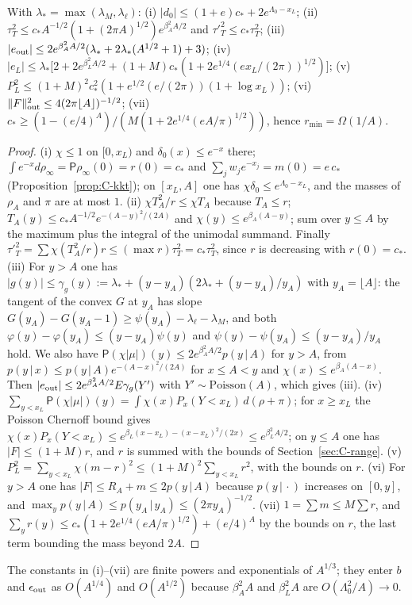 \begin{lemma}\label{lem:C-edge}
With $\lambda_*=\max(\lambda_M,\lambda_\ell)$:
(i) $|d_0|\le(1+e)c_*+2e^{\Lambda_0-x_L}$;
(ii) $\tau_T^2\le c_*A^{-1/2}(1+(2\pi A)^{1/2})e^{\beta_A^2A/2}$ and $\tau'^2_T\le c_*\tau_T^2$;
(iii) $|e_{\rm out}|\le2e^{\beta_A^2A/2}(\lambda_*+2\lambda_*(A^{1/2}+1)+3)$;
(iv) $|e_L|\le\lambda_*\bigl[2+2e^{\beta_L^2A/2}+(1+M)c_*(1+2e^{1/4}(ex_L/(2\pi))^{1/2})\bigr]$;
(v) $P_L^2\le(1+M)^2c_*^2(1+e^{1/2}(e/(2\pi))(1+\log x_L))$;
(vi) $\|F\|^2_{\rm out}\le4(2\pi\lfloor A\rfloor)^{-1/2}$;
(vii) $c_*\ge(1-(e/4)^A)/(M(1+2e^{1/4}(eA/\pi)^{1/2}))$, hence $r_{\min}=\Omega(1/A)$.
\end{lemma}
\begin{proof}
(i) $\chi\le1$ on $[0,x_L)$ and $\delta_0(x)\le e^{-x}$ there; $\int e^{-x}d\rho_\infty=\mathsf P\rho_\infty(0)=r(0)=c_*$ and
$\sum_jw_je^{-x_j}=m(0)=e\,c_*$ (Proposition~\ref{prop:C-kkt}); on $[x_L,A]$ one has $\chi\delta_0\le e^{\Lambda_0-x_L}$, and the masses of
$\rho_A$ and $\pi$ are at most $1$.
(ii) $\chi T_A^2/r\le\chi T_A$ because $T_A\le r$; $T_A(y)\le c_*A^{-1/2}e^{-(A-y)^2/(2A)}$ and $\chi(y)\le e^{\beta_A(A-y)}$; sum over
$y\le A$ by the maximum plus the integral of the unimodal summand. Finally $\tau'^2_T=\sum\chi(T_A^2/r)r\le(\max r)\tau_T^2=c_*\tau_T^2$,
since $r$ is decreasing with $r(0)=c_*$.
(iii) For $y>A$ one has $|g(y)|\le\gamma_g(y):=\lambda_*+(y-y_A)(2\lambda_*+(y-y_A)/y_A)$ with $y_A=\lfloor A\rfloor$: the tangent of the convex
$G$ at $y_A$ has slope $G(y_A)-G(y_A-1)\ge\psi(y_A)-\lambda_\ell-\lambda_M$, and both $\varphi(y)-\varphi(y_A)\le(y-y_A)\psi(y)$ and $\psi(y)-\psi(y_A)\le(y-y_A)/y_A$ hold. We also have $\mathsf P(\chi|\mu|)(y)\le2e^{\beta_A^2A/2}p(y\,|\,A)$ for $y>A$, from
$p(y\,|\,x)\le p(y\,|\,A)e^{-(A-x)^2/(2A)}$ for $x\le A<y$ and $\chi(x)\le e^{\beta_A(A-x)}$. Then
$|e_{\rm out}|\le2e^{\beta_A^2A/2}E\gamma_g(Y')$ with $Y'\sim\mathrm{Poisson}(A)$, which gives (iii).
(iv) $\sum_{y<x_L}\mathsf P(\chi|\mu|)(y)=\int\chi(x)P_x(Y<x_L)\,d(\rho+\pi)$; for $x\ge x_L$ the Poisson Chernoff bound gives
$\chi(x)P_x(Y<x_L)\le e^{\beta_L(x-x_L)-(x-x_L)^2/(2x)}\le e^{\beta_L^2A/2}$; on $y\le A$ one has $|F|\le(1+M)r$, and $r$ is summed with the
bounds of Section~\ref{sec:C-range}.
(v) $P_L^2=\sum_{y<x_L}\chi(m-r)^2\le(1+M)^2\sum_{y<x_L}r^2$, with the bounds on $r$.
(vi) For $y>A$ one has $|F|\le R_A+m\le2p(y\,|\,A)$ because $p(y\,|\,\cdot)$ increases on $[0,y]$, and
$\max_yp(y\,|\,A)\le p(y_A\,|\,y_A)\le(2\pi y_A)^{-1/2}$.
(vii) $1=\sum m\le M\sum r$, and $\sum_yr(y)\le c_*(1+2e^{1/4}(eA/\pi)^{1/2})+(e/4)^A$ by the bounds on $r$, the last term bounding
the mass beyond $2A$.
\end{proof}
The constants in (i)--(vii) are finite powers and exponentials of $A^{1/3}$; they enter $b$ and $\epsilon_{\rm out}$ as $O(A^{1/4})$
and $O(A^{1/2})$ because $\beta_A^2A$ and $\beta_L^2A$ are $O(\Lambda_0^2/A)\to0$.

